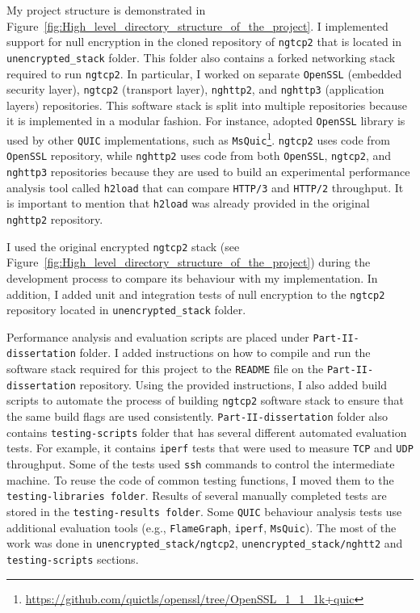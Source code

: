 \documentclass[12pt,a4paper,twoside,openright]{report}
\begin{document}
My project structure is demonstrated in Figure~\ref{fig:High_level_directory_structure_of_the_project}.
I implemented support for null encryption in the cloned repository of \texttt{ngtcp2} that is located in \texttt{unencrypted\_stack} folder.
This folder also contains a forked networking stack required to run \texttt{ngtcp2}. 
In particular, I worked on separate \texttt{OpenSSL} (embedded security layer), \texttt{ngtcp2} (transport layer), \texttt{nghttp2}, and \texttt{nghttp3} (application layers) repositories.
This software stack is split into multiple repositories because it is implemented in a modular fashion.
For instance, adopted \texttt{OpenSSL} library is used by other \texttt{QUIC} implementations, such as \texttt{MsQuic}\footnote{\url{https://github.com/quictls/openssl/tree/OpenSSL_1_1_1k+quic}}.
\texttt{ngtcp2} uses code from \texttt{OpenSSL} repository, while \texttt{nghttp2} uses code from both \texttt{OpenSSL},  \texttt{ngtcp2}, and  \texttt{nghttp3} repositories because they are used to build an experimental performance analysis tool called \texttt{h2load} that can compare \texttt{HTTP/3} and \texttt{HTTP/2} throughput.
It is important to mention that \texttt{h2load} was already provided in the original \texttt{nghttp2} repository.


I used the original encrypted \texttt{ngtcp2} stack (see Figure~\ref{fig:High_level_directory_structure_of_the_project}) during the development process to compare its behaviour with my implementation.
In addition, I added unit and integration tests of null encryption to the \texttt{ngtcp2} repository located in \texttt{unencrypted\_stack} folder. 






Performance analysis and evaluation scripts are placed under \texttt{Part-II-dissertation} folder.
I added instructions on how to compile and run the software stack required for this project to the \texttt{README} file on the \texttt{Part-II-dissertation} repository.
Using the provided instructions, I also added build scripts to automate the process of building \texttt{ngtcp2} software stack to ensure that the same build flags are used consistently.
\texttt{Part-II-dissertation} folder also contains \texttt{testing-scripts} folder that has several different automated evaluation tests.
For example, it contains \texttt{iperf} tests that were used to measure \texttt{TCP} and \texttt{UDP} throughput.
Some of the tests used \texttt{ssh} commands to control the intermediate machine.
To reuse the code of common testing functions, I moved them to the \texttt{testing-libraries folder}.
Results of several manually completed tests are stored in the \texttt{testing-results folder}.
Some \texttt{QUIC} behaviour analysis tests use additional evaluation tools (e.g., \texttt{FlameGraph}, \texttt{iperf}, \texttt{MsQuic}).
The most of the work was done in \texttt{unencrypted\_stack/ngtcp2}, \texttt{unencrypted\_stack/nghtt2} and \texttt{testing-scripts} sections.
\end{document}
